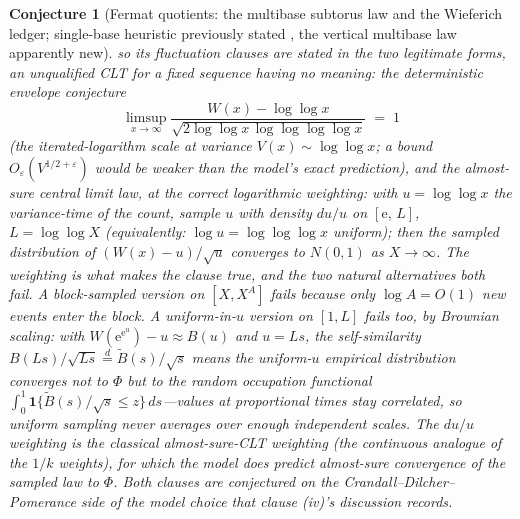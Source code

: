 \documentclass[11pt]{article}
\newtheorem{conjecture}{Conjecture}
\theoremstyle{definition}
\newcommand{\e}{\mathrm{e}}
\begin{document}
\begin{conjecture}[Fermat quotients: the multibase subtorus law and
the Wieferich ledger; single-base heuristic previously stated
\cite{CDP}, the vertical multibase law apparently new]
so its fluctuation clauses are stated in the two legitimate forms,
an unqualified CLT for a fixed sequence having no meaning: the
\emph{deterministic envelope conjecture}
\[
\limsup_{x\to\infty}
\frac{W(x)-\log\log x}
{\sqrt{2\log\log x\,\log\log\log\log x}}\;=\;1
\]
(the iterated-logarithm scale at variance $V(x)\sim\log\log x$; a
bound $O_\varepsilon(V^{1/2+\varepsilon})$ would be weaker than
the model's exact prediction), and the \emph{almost-sure central
limit law, at the correct logarithmic weighting}: with
$u=\log\log x$ the variance-time of the count, sample $u$ with
density $du/u$ on $[\e,\,L]$, $L=\log\log X$ (equivalently: $\log u
=\log\log\log x$ uniform); then the sampled distribution of
$(W(x)-u)/\sqrt u$ converges to $N(0,1)$ as $X\to\infty$.  The
weighting is what makes the clause true, and the two natural
alternatives both fail.  A block-sampled version on $[X,X^A]$
fails because only $\log A=O(1)$ new events enter the block.  A
\emph{uniform}-in-$u$ version on $[1,L]$ fails too, by Brownian
scaling: with
$W(\e^{\e^u})-u\approx B(u)$ and $u=Ls$, the self-similarity
$B(Ls)/\sqrt{Ls}\overset{d}=\widetilde B(s)/\sqrt s$ means the
uniform-$u$ empirical distribution converges not to $\Phi$ but to
the \emph{random} occupation functional
$\int_0^1\mathbf 1\{\widetilde B(s)/\sqrt s\le z\}\,ds$---values at
proportional times stay correlated, so uniform sampling never
averages over enough independent scales.  The $du/u$ weighting is
the classical almost-sure-CLT weighting (the continuous analogue of
the $1/k$ weights), for which the model does predict almost-sure
convergence of the sampled law to $\Phi$.  Both clauses are
conjectured on the
Crandall--Dilcher--Pomerance side of the model choice that clause
(iv)'s discussion records.
\end{conjecture}
\end{document}
